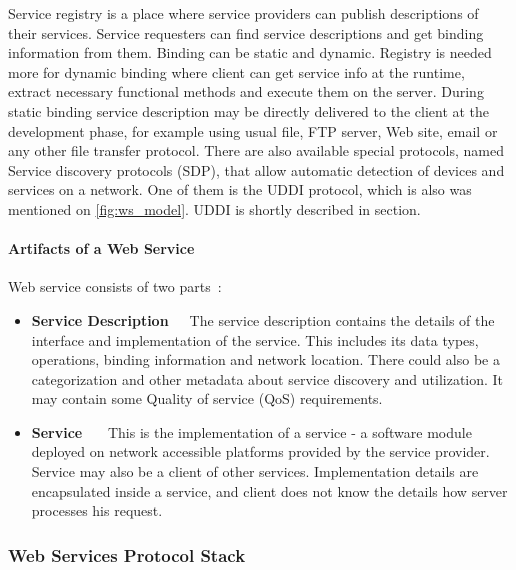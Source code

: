 Service registry is a place where service providers can publish
descriptions of their services. Service requesters can find service descriptions
and get binding information from them. Binding can be static and dynamic.
Registry is needed more for dynamic binding where client can get service info at
the runtime, extract necessary functional methods and execute them on the
server. During static binding service description may be directly delivered to
the client at the development phase, for example using usual file, \gls{FTP}
server, Web site, email or any other file transfer protocol.
There are also available special protocols, named Service discovery protocols
(SDP), that allow automatic detection of devices and services on a network. One
of them is the \gls{UDDI} protocol, which is also was mentioned on
\autoref{fig:ws_model}. \gls{UDDI} is shortly described in
 section.

\paragraph{\textbf{Artifacts of a Web Service}}
\newline
Web service consists of two parts~\cite{Kreger2001-WSC}:
\begin{itemize} 
\item \label{itm:service_description_artifact} 
\textbf{Service Description}~~~The
service description contains the details of the interface and implementation of the service. This includes its data types, operations, binding
information and network location. There could also be a categorization and
other metadata about service discovery and utilization. It may contain some
Quality of service (QoS) requirements. 

 \item \textbf{Service}
 ~~~This is the implementation of a service - a software module deployed on network accessible platforms provided by the service provider.
 Service may also be a client of other services. Implementation details
 are encapsulated inside a service, and client does not know the details how
 server processes his request.
\end{itemize}



\subsubsection{Web Services Protocol Stack}
\label{sec:ws_protocol_stack}

